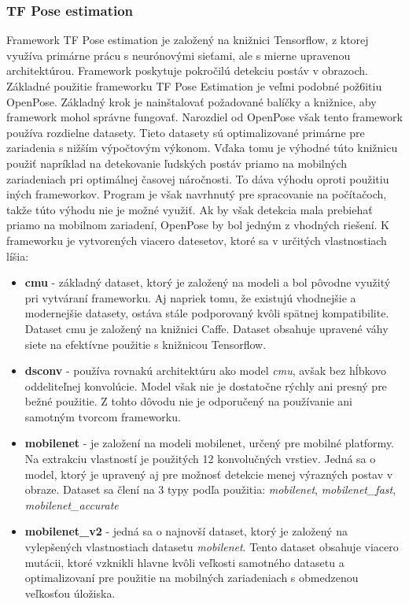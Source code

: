 \documentclass[slovak,master,dept460,male,cpp,cpdeclaration]{diploma}
\begin{document}
\subsubsection*{TF Pose estimation}
Framework TF Pose estimation je založený na knižnici Tensorflow, z ktorej využíva primárne prácu s neurónovými sieťami, ale s mierne upravenou architektúrou. Framework poskytuje pokročilú detekciu postáv v obrazoch. Základné použitie frameworku TF Pose Estimation je veľmi podobné pož6itiu OpenPose. Základný krok je nainštalovať požadované balíčky a knižnice, aby framework mohol správne fungovať. Narozdiel od OpenPose však tento framework používa rozdielne datasety. Tieto datasety sú optimalizované primárne pre zariadenia s nižším výpočtovým výkonom. Vďaka tomu je výhodné túto knižnicu použiť napríklad na detekovanie ľudských postáv priamo na mobilných zariadeniach pri optimálnej časovej náročnosti. To dáva výhodu oproti použitiu iných frameworkov. Program je však navrhnutý pre spracovanie na   počítačoch, takže túto výhodu nie je možné využiť. Ak by však detekcia mala prebiehať priamo na mobilnom zariadení, OpenPose by bol jedným z vhodných riešení. K frameworku je vytvorených viacero datesetov, ktoré sa v určitých vlastnostiach líšia:
 \begin{itemize}
\item \textbf{cmu} - základný dataset, ktorý je založený na modeli a bol pôvodne využitý pri vytváraní frameworku. Aj napriek tomu, že  existujú vhodnejšie a modernejšie  datasety, ostáva stále podporovaný kvôli spätnej kompatibilite. Dataset cmu je založený na knižnici Caffe. Dataset obsahuje upravené váhy siete na efektívne použitie s knižnicou Tensorflow.
\item \textbf{dsconv} - používa rovnakú architektúru ako model \textit{cmu}, avšak bez hĺbkovo oddeliteľnej konvolúcie. Model však nie je dostatočne rýchly ani presný pre bežné použitie. Z tohto dôvodu nie je odporučený na používanie ani samotným tvorcom frameworku.
\item \textbf{mobilenet} - je založení na modeli mobilenet, určený pre mobilné platformy. Na extrakciu  vlastností je použitých 12 konvolučných vrstiev. Jedná sa o model, ktorý je upravený aj pre  možnosť detekcie menej výrazných postav v obraze. Dataset sa člení  na 3 typy podľa použitia: \textit{mobilenet}, \textit{mobilenet\_fast}, \textit{mobilenet\_accurate}
\item \textbf{mobilenet\_v2} - jedná sa o najnovší dataset, ktorý je založený na vylepšených vlastnostiach datasetu \textit{mobilenet}. Tento dataset obsahuje viacero mutácii, ktoré  vzknikli hlavne kvôli veľkosti samotného datasetu a optimalizovaní pre použitie na mobilných zariadeniach s obmedzenou veľkosťou úložiska.
\end{itemize}
\end{document}
